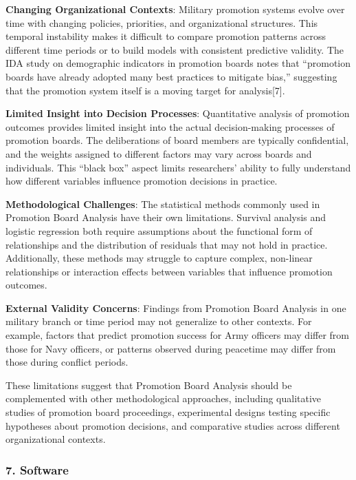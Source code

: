 \documentclass[./main.tex]{subfiles}
\begin{document}
\textbf{Changing Organizational Contexts}: Military promotion systems
evolve over time with changing policies, priorities, and organizational
structures. This temporal instability makes it difficult to compare
promotion patterns across different time periods or to build models with
consistent predictive validity. The IDA study on demographic indicators
in promotion boards notes that ``promotion boards have already adopted
many best practices to mitigate bias,'' suggesting that the promotion
system itself is a moving target for analysis{[}7{]}.

\textbf{Limited Insight into Decision Processes}: Quantitative analysis
of promotion outcomes provides limited insight into the actual
decision-making processes of promotion boards. The deliberations of
board members are typically confidential, and the weights assigned to
different factors may vary across boards and individuals. This ``black
box'' aspect limits researchers' ability to fully understand how
different variables influence promotion decisions in practice.

\textbf{Methodological Challenges}: The statistical methods commonly
used in Promotion Board Analysis have their own limitations. Survival
analysis and logistic regression both require assumptions about the
functional form of relationships and the distribution of residuals that
may not hold in practice. Additionally, these methods may struggle to
capture complex, non-linear relationships or interaction effects between
variables that influence promotion outcomes.

\textbf{External Validity Concerns}: Findings from Promotion Board
Analysis in one military branch or time period may not generalize to
other contexts. For example, factors that predict promotion success for
Army officers may differ from those for Navy officers, or patterns
observed during peacetime may differ from those during conflict periods.

These limitations suggest that Promotion Board Analysis should be
complemented with other methodological approaches, including qualitative
studies of promotion board proceedings, experimental designs testing
specific hypotheses about promotion decisions, and comparative studies
across different organizational contexts.

\subsubsection{7. Software}\label{software}
\end{document}
